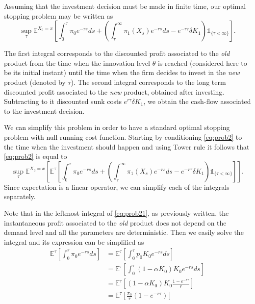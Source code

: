 Assuming that the investment decision must be made in finite time, our optimal stopping problem may be written as
\begin{equation}
\sup _\tau \mathds{E}^{X_0=x} \left[  \int_0^\tau \pi_0e^{-rs} ds +  \left( \int_\tau^\infty \pi_1(X_s)e^{-rs}ds -e^{-r\tau}\delta K_1 \right) \mathds{1}_{\{ \tau < \infty \}} \right].
\label{eq:prob2}
\end{equation}

The first integral corresponds to the discounted profit associated to the \textit{old} product from the time when the innovation level $\theta$ is reached (considered here to be its initial instant) until the time when the firm decides to invest in the \textit{new} product (denoted by $\tau$). The second integral corresponds to the long term discounted profit associated to the \textit{new} product, obtained after investing. Subtracting to it discounted sunk costs $e^{r \tau} \delta K_1$, we obtain the cash-flow associated to the investment decision.

We can simplify this problem in order to have a standard optimal stopping problem with null running cost function.
Starting by conditioning \eqref{eq:prob2} to the time when the investment should happen and using Tower rule it follows that \eqref{eq:prob2} is equal to
\begin{equation}
\sup _\tau \mathds{E}^{X_0=x} \left[ \mathds{E}^{\tau} \left[  \int_0^\tau \pi_0e^{-rs} ds +  \left(  \int_\tau^\infty \pi_1(X_s)e^{-rs}ds -e^{-r\tau} \delta K_1   \right) \mathds{1}_{\{ \tau < \infty \}} \right] \right].
\label{eq:prob21}
\end{equation}
Since expectation is a linear operator, we can simplify each of the integrals separately.

Note that in the leftmost integral of \eqref{eq:prob21}, as previously written, the instantaneous profit associated to the \textit{old} product does not depend on the demand level and all the parameters are deterministic. Then we easily solve the integral and its expression can be simplified as
\begin{align}
\mathds{E}^{\tau} \left[\int_0^\tau \pi_0e^{-rs} ds \right] 
&= \mathds{E}^{\tau} \left[ \int_0^\tau p_0K_0e^{-rs} ds \right] \nonumber \\
&= \mathds{E}^{\tau} \left[ \int_0^\tau (1-\alpha K_0) K_0e^{-rs} ds \right] \nonumber \\
&= \mathds{E}^{\tau} \left[ (1-\alpha K_0) K_0 \frac{1-e^{-r \tau}}{r} \right] \nonumber\\
&= \mathds{E}^{\tau} \left[ \frac{\pi_0}{r} (1-e^{-r \tau}) \right]
\label{g2}
\end{align}

